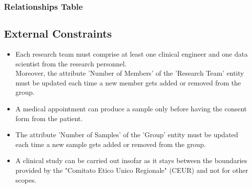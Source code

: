 \subsubsection{Relationships Table}


\subsection{External Constraints}
\begin{itemize}
    \item Each research team must comprise at least one clinical engineer and one data scientist from the research personnel.\\
    Moreover, the attribute 'Number of Members' of the 'Research Team' entity must be updated each time a new member gets added or removed from the group.
    \item A medical appointment can produce a sample only before having the consent form from the patient.
    \item The attribute 'Number of Samples' of the 'Group' entity must be updated each time a new sample gets added or removed from the group.
    \item A clinical study can be carried out insofar as it stays between the boundaries provided by the "Comitato Etico Unico Regionale" (CEUR) and not for other scopes.
\end{itemize}


